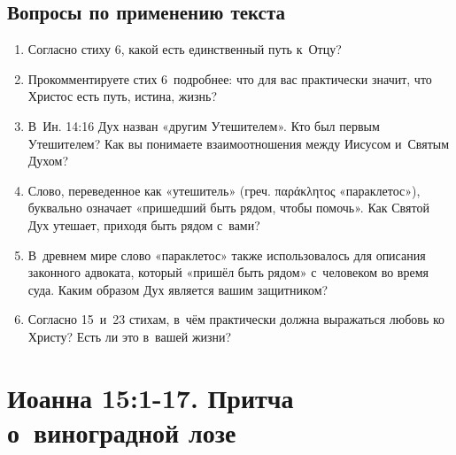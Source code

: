 \documentclass[a4paper,12pt]{article}
\begin{document}
\subsection*{Вопросы по применению текста} 
\begin{enumerate}
    \item Согласно стиху 6, какой есть единственный путь к~Отцу? 
    
    \myline
    
    \myline
    \item Прокомментируете стих 6~подробнее: что для вас практически значит, что Христос есть путь, истина, жизнь? 
    
    \myline
    
    \myline
    \item В~Ин. 14:16 Дух назван «другим Утешителем». Кто был первым Утешителем? Как вы понимаете взаимоотношения между Иисусом и~Святым Духом? 
    
    \myline
    
    \myline
    \item Слово, переведенное как «утешитель» (греч. παράκλητος «параклетос»), буквально означает «пришедший быть рядом, чтобы помочь». Как Святой Дух утешает, приходя быть рядом с~вами? 
    
    \myline
    
    \myline
    \item В~древнем мире слово «параклетос» также использовалось для описания законного адвоката, который «пришёл быть рядом» с~человеком во время суда. Каким образом Дух является вашим защитником? 
    
    \myline
    
    \myline
    \item Согласно 15~и~23 стихам, в~чём практически должна выражаться любовь ко Христу? Есть ли это в~вашей жизни?
    
    \myline
    
    \myline
\end{enumerate}



\section{Иоанна 15:1-17. Притча о~виноградной лозе}
\end{document}
